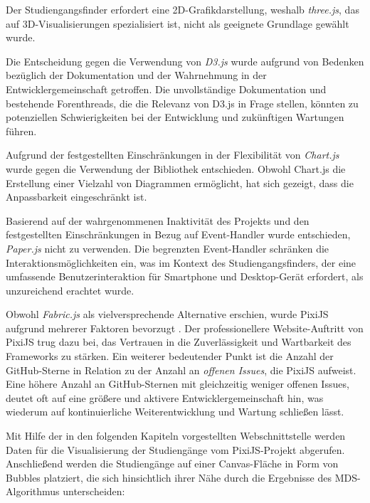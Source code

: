 
Der Studiengangsfinder erfordert eine 2D-Grafikdarstellung, weshalb
\textit{three.js}, das auf 3D-Visualisierungen spezialisiert ist, nicht als
geeignete Grundlage gewählt wurde. \parencite{threejs_threejs_2023}

Die Entscheidung gegen die Verwendung von \textit{D3.js} wurde aufgrund
von Bedenken bezüglich der Dokumentation und der Wahrnehmung in der 
Entwicklergemeinschaft getroffen. Die unvollständige Dokumentation und
bestehende Forenthreads, die die Relevanz von D3.js in Frage stellen, könnten zu
potenziellen Schwierigkeiten bei der Entwicklung und zukünftigen Wartungen
führen. \parencite{bostock_d3js_2023}


Aufgrund der festgestellten Einschränkungen in der Flexibilität von
\textit{Chart.js} wurde gegen die Verwendung der Bibliothek entschieden. Obwohl
Chart.js die Erstellung einer Vielzahl von Diagrammen ermöglicht, hat sich
gezeigt, dass die Anpassbarkeit eingeschränkt ist. \parencite{etimberg_chartjs_2023}

Basierend auf der wahrgenommenen Inaktivität des Projekts und den festgestellten 
Einschränkungen in Bezug auf Event-Handler wurde entschieden, \textit{Paper.js}
nicht zu verwenden. \parencite{lehni_paperjs_2023} Die begrenzten Event-Handler schränken
die Interaktionsmöglichkeiten ein, was im Kontext des Studiengangsfinders, der
eine umfassende Benutzerinteraktion für Smartphone und Desktop-Gerät erfordert,
als unzureichend erachtet wurde. \parencite{etimberg_paperjs_2023}

Obwohl \textit{Fabric.js} als vielversprechende Alternative erschien, wurde
PixiJS aufgrund mehrerer Faktoren bevorzugt \parencite{zaytsev_fabricjs_2023}. Der
professionellere Website-Auftritt von PixiJS trug dazu bei, das Vertrauen in
die Zuverlässigkeit und Wartbarkeit des Frameworks zu stärken. Ein weiterer
bedeutender Punkt ist die Anzahl der GitHub-Sterne in Relation zu der Anzahl an
\textit{offenen Issues}, die PixiJS aufweist. Eine höhere Anzahl an
GitHub-Sternen mit gleichzeitig weniger offenen Issues, deutet oft auf eine
größere und aktivere Entwicklergemeinschaft hin, was wiederum auf
kontinuierliche Weiterentwicklung und Wartung schließen lässt.
\parencite{batista_github_2023}

Mit Hilfe der in den folgenden Kapiteln vorgestellten Webschnittstelle werden Daten für die Visualisierung der Studiengänge vom PixiJS-Projekt abgerufen. Anschließend werden die Studiengänge auf einer Canvas-Fläche in Form von Bubbles platziert, die sich hinsichtlich ihrer Nähe durch die Ergebnisse des MDS-Algorithmus unterscheiden:

